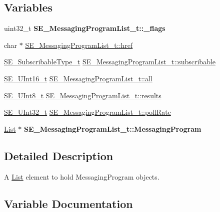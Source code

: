 \subsection*{Variables}
\begin{DoxyCompactItemize}
\item 
\mbox{\label{group__MessagingProgramList_ga59f37fbd6736ed7d4d5846addc99250e}} 
uint32\+\_\+t {\bfseries S\+E\+\_\+\+Messaging\+Program\+List\+\_\+t\+::\+\_\+flags}
\item 
char $\ast$ \hyperlink{group__MessagingProgramList_gacb5855c7001a05d1d58e43cc706e70e9}{S\+E\+\_\+\+Messaging\+Program\+List\+\_\+t\+::href}
\item 
\hyperlink{group__SubscribableType_ga5c41f553d369710ed34619266bf2551e}{S\+E\+\_\+\+Subscribable\+Type\+\_\+t} \hyperlink{group__MessagingProgramList_gaa0e2fbe57fd90cc867bac24472c1d8df}{S\+E\+\_\+\+Messaging\+Program\+List\+\_\+t\+::subscribable}
\item 
\hyperlink{group__UInt16_gac68d541f189538bfd30cfaa712d20d29}{S\+E\+\_\+\+U\+Int16\+\_\+t} \hyperlink{group__MessagingProgramList_ga67178b17c2bc14694747e71a75651161}{S\+E\+\_\+\+Messaging\+Program\+List\+\_\+t\+::all}
\item 
\hyperlink{group__UInt8_gaf7c365a1acfe204e3a67c16ed44572f5}{S\+E\+\_\+\+U\+Int8\+\_\+t} \hyperlink{group__MessagingProgramList_gacdca1166c19d3e607e004b7511f6f70b}{S\+E\+\_\+\+Messaging\+Program\+List\+\_\+t\+::results}
\item 
\hyperlink{group__UInt32_ga70bd4ecda3c0c85d20779d685a270cdb}{S\+E\+\_\+\+U\+Int32\+\_\+t} \hyperlink{group__MessagingProgramList_gabeb074e1c506b7857d306774059cf652}{S\+E\+\_\+\+Messaging\+Program\+List\+\_\+t\+::poll\+Rate}
\item 
\mbox{\label{group__MessagingProgramList_ga4bcae91656f93bbcfccc548f1a046618}} 
\hyperlink{structList}{List} $\ast$ {\bfseries S\+E\+\_\+\+Messaging\+Program\+List\+\_\+t\+::\+Messaging\+Program}
\end{DoxyCompactItemize}


\subsection{Detailed Description}
A \hyperlink{structList}{List} element to hold Messaging\+Program objects. 

\subsection{Variable Documentation}
\mbox{\label{group__MessagingProgramList_ga67178b17c2bc14694747e71a75651161}} 
